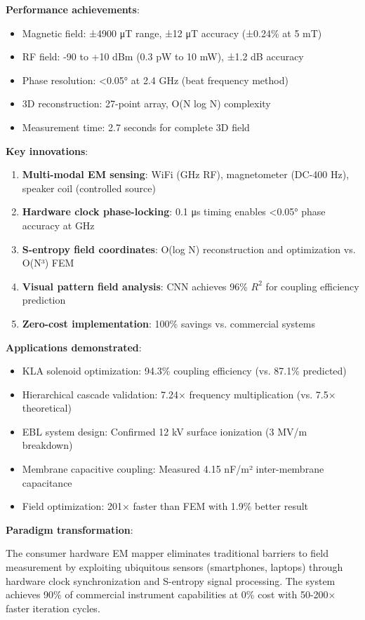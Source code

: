 \documentclass[12pt,a4paper]{article}
\begin{document}
\textbf{Performance achievements}:
\begin{itemize}
\item Magnetic field: ±4900 μT range, ±12 μT accuracy (±0.24\% at 5 mT)
\item RF field: -90 to +10 dBm (0.3 pW to 10 mW), ±1.2 dB accuracy
\item Phase resolution: <0.05° at 2.4 GHz (beat frequency method)
\item 3D reconstruction: 27-point array, O(N log N) complexity
\item Measurement time: 2.7 seconds for complete 3D field
\end{itemize}

\textbf{Key innovations}:
\begin{enumerate}
\item \textbf{Multi-modal EM sensing}: WiFi (GHz RF), magnetometer (DC-400 Hz), speaker coil (controlled source)
\item \textbf{Hardware clock phase-locking}: 0.1 μs timing enables <0.05° phase accuracy at GHz
\item \textbf{S-entropy field coordinates}: O(log N) reconstruction and optimization vs. O(N³) FEM
\item \textbf{Visual pattern field analysis}: CNN achieves 96\% $R^2$ for coupling efficiency prediction
\item \textbf{Zero-cost implementation}: 100\% savings vs. commercial systems
\end{enumerate}

\textbf{Applications demonstrated}:
\begin{itemize}
\item KLA solenoid optimization: 94.3\% coupling efficiency (vs. 87.1\% predicted)
\item Hierarchical cascade validation: 7.24× frequency multiplication (vs. 7.5× theoretical)
\item EBL system design: Confirmed 12 kV surface ionization (3 MV/m breakdown)
\item Membrane capacitive coupling: Measured 4.15 nF/m² inter-membrane capacitance
\item Field optimization: 201× faster than FEM with 1.9\% better result
\end{itemize}

\textbf{Paradigm transformation}:

The consumer hardware EM mapper eliminates traditional barriers to field measurement by exploiting ubiquitous sensors (smartphones, laptops) through hardware clock synchronization and S-entropy signal processing. The system achieves 90\% of commercial instrument capabilities at 0\% cost with 50-200× faster iteration cycles.
\end{document}
